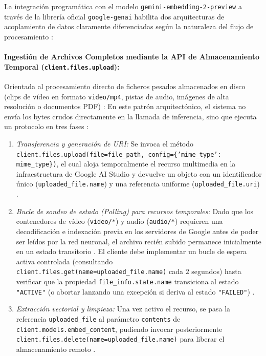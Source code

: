 La integración programática con el modelo \texttt{gemini-embedding-2-preview} a través de la librería oficial \texttt{google-genai} habilita dos arquitecturas de acoplamiento de datos claramente diferenciadas según la naturaleza del flujo de procesamiento \cite{gemini_emb2_docs, gemini_embeddings_general_docs}: %

\paragraph{Ingestión de Archivos Completos mediante la API de Almacenamiento Temporal (\texttt{client.files.upload}):}
Orientada al procesamiento directo de ficheros pesados almacenados en disco (clips de vídeo en formato \texttt{video/mp4}, pistas de audio, imágenes de alta resolución o documentos PDF) \cite{gemini_emb2_docs, gemini_embeddings_general_docs}: %
En este patrón arquitectónico, el sistema no envía los bytes crudos directamente en la llamada de inferencia, sino que ejecuta un protocolo en tres fases \cite{gemini_emb2_docs}: %
\begin{enumerate}
    \item \textit{Transferencia y generación de URI:} Se invoca el método \texttt{client.files.upload(file=file\_path, config=\{'mime\_type': mime\_type\})}, el cual aloja temporalmente el recurso multimedia en la infraestructura de Google AI Studio y devuelve un objeto con un identificador único (\texttt{uploaded\_file.name}) y una referencia uniforme (\texttt{uploaded\_file.uri}) \cite{gemini_emb2_docs}. %
    \item \textit{Bucle de sondeo de estado (\textit{Polling}) para recursos temporales:} Dado que los contenedores de vídeo (\texttt{video/*}) y audio (\texttt{audio/*}) requieren una decodificación e indexación previa en los servidores de Google antes de poder ser leídos por la red neuronal, el archivo recién subido permanece inicialmente en un estado transitorio \cite{gemini_emb2_docs}. %
    El cliente debe implementar un bucle de espera activa controlada (consultando \texttt{client.files.get(name=uploaded\_file.name)} cada $2$ segundos) hasta verificar que la propiedad \texttt{file\_info.state.name} transiciona al estado \texttt{"ACTIVE"} (o abortar lanzando una excepción si deriva al estado \texttt{"FAILED"}) \cite{gemini_emb2_docs}. %
    \item \textit{Extracción vectorial y limpieza:} Una vez activo el recurso, se pasa la referencia \texttt{uploaded\_file} al parámetro \texttt{contents} de \texttt{client.models.embed\_content}, pudiendo invocar posteriormente \texttt{client.files.delete(name=uploaded\_file.name)} para liberar el almacenamiento remoto \cite{gemini_emb2_docs}. %
\end{enumerate}


